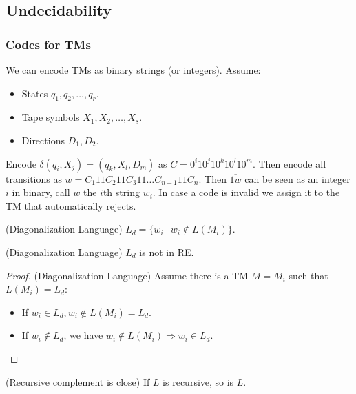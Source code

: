 
\usepackage{../../lectures_preamble}


    \subsection{Undecidability}
        \subsubsection{Codes for TMs}
        \label{Codes for TMs}
        We can encode TMs as binary strings (or integers). Assume:
        \begin{itemize}
            \item States $q_1,q_2,\ldots,q_{r}$.
            \item Tape symbols $X_1,X_2,\ldots,X_{s}$.
            \item Directions $D_1,D_2$.
        \end{itemize}
        Encode $\delta\left( q_{i},X_{j} \right) =\left( q_{k},X_{l},D_{m} \right) $ as $C=0^{i}1 0^{j}1 0^{k}1 0^{l}1 0^{m}$. Then encode all transitions as $w=C_1 11 C_2 11 C_3 11\ldots C_{n-1} 11 C_{n}$. Then $\overline{1w}$ can be seen as an integer $i$ in binary, call $w$ the $i$th string $w_{i}$. In case a code is invalid we assign it to the TM that automatically rejects.
        \begin{definition}
            (Diagonalization Language) $L_{d}=\{w_{i}\ |\ w_{i}\notin L\left( M_{i} \right) \}$.
        \end{definition}
        \begin{theorem}
            (Diagonalization Language) $L_{d}$ is not in RE.
        \end{theorem}
        \begin{proof}
            (Diagonalization Language) Assume there is a TM $M=M_{i}$ such that $L\left( M_{i} \right) =L_{d}$:
            \begin{itemize}
                \item If $w_{i}\in L_{d},w_{i}\notin L\left( M_{i} \right) =L_{d}$.
                \item If $w_{i}\notin L_{d}$, we have $w_{i}\notin L\left( M_{i} \right) \Rightarrow w_{i}\in L_{d}$.
            \end{itemize}
        \end{proof}
        \begin{theorem}
            (Recursive complement is close) If $L$ is recursive, so is $\overline{L}$.
        \end{theorem}
